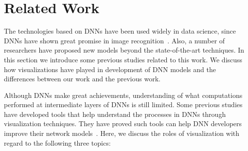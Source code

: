 \section{Related Work}
\label{sec:related}

The technologies based on DNNs have been used widely in data science, since DNNs have shown great promise in image recognition~\cite{krizhevsky2012imagenet}.
Also, a number of researchers have proposed new models beyond the state-of-the-art techniques.
In this section we introduce some previous studies related to this work.
We discuss how visualizations have played in development of DNN models and the differences between our work and the previous work.

Although DNNs make great achievements, understanding of what computations performed at intermediate layers of DNNs is still limited.
Some previous studies have developed tools that help understand the processes in DNNs through visualization techniques.
They have proved such tools can help DNN developers improve their network models~\cite{tzeng2005opening,yosinski2015understanding,liu2017towards}.
Here, we discuss the roles of visualization with regard to the following three topics:

